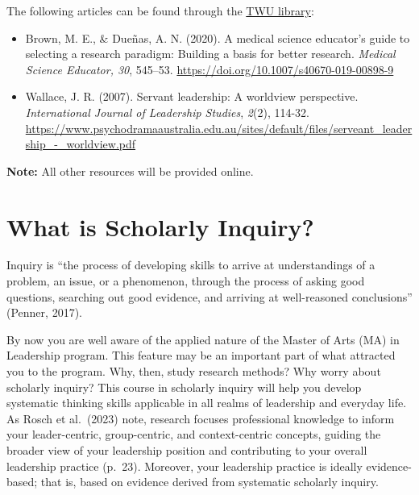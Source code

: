 \documentclass[
  letterpaper,
  DIV=11,
  numbers=noendperiod]{scrreprt}
\providecommand{\tightlist}{%
  \setlength{\itemsep}{0pt}\setlength{\parskip}{0pt}}\usepackage{longtable,booktabs,array}
\begin{document}
The following articles can be found through the
\href{https://www.twu.ca/academics/library}{TWU library}:

\begin{itemize}
\tightlist
\item
  Brown, M. E., \& Dueñas, A. N. (2020). A medical science educator's
  guide to selecting a research paradigm: Building a basis for better
  research. \emph{Medical Science Educator, 30}, 545--53.
  \url{https://doi.org/10.1007/s40670-019-00898-9}
\item
  Wallace, J. R. (2007). Servant leadership: A worldview perspective.
  \emph{International Journal of Leadership Studies}, \emph{2}(2),
  114-32.
  \url{https://www.psychodramaaustralia.edu.au/sites/default/files/serveant_leadership_-_worldview.pdf}
\end{itemize}

\textbf{Note:} All other resources will be provided online.


\chapter*{What is Scholarly Inquiry?}\label{what-is-scholarly-inquiry}


Inquiry is ``the process of developing skills to arrive at
understandings of a problem, an issue, or a phenomenon, through the
process of asking good questions, searching out good evidence, and
arriving at well-reasoned conclusions'' (Penner, 2017).

By now you are well aware of the applied nature of the Master of Arts
(MA) in Leadership program. This feature may be an important part of
what attracted you to the program. Why, then, study research methods?
Why worry about scholarly inquiry? This course in scholarly inquiry will
help you develop systematic thinking skills applicable in all realms of
leadership and everyday life. As Rosch et al.~(2023) note, research
focuses professional knowledge to inform your leader-centric,
group-centric, and context-centric concepts, guiding the broader view of
your leadership position and contributing to your overall leadership
practice (p.~23). Moreover, your leadership practice is ideally
evidence-based; that is, based on evidence derived from systematic
scholarly inquiry.
\end{document}
